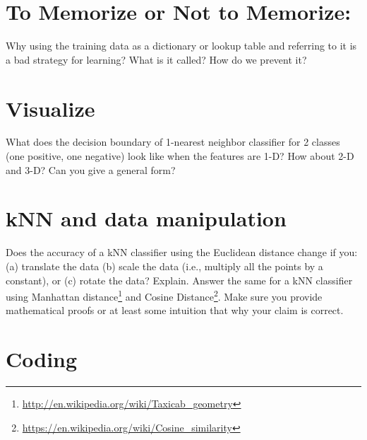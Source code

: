 \documentclass[fleqn]{article}
\begin{document}



\section{To Memorize or Not to Memorize:}
Why using the training data as a dictionary or lookup table and referring to it is a bad strategy for learning? What is it called? How do we prevent it?


\section{Visualize} What does the decision boundary of 1-nearest neighbor classifier for 2 classes (one positive, one negative) look like when the features are 1-D? How about 2-D and 3-D? Can you give a general form?

\section{kNN and data manipulation}

Does the accuracy of a kNN classifier using the Euclidean distance change if you:(a) translate the data (b) scale the data (i.e., multiply all the points by a constant), or (c) rotate the data? Explain. Answer the same for a kNN classifier using Manhattan distance\footnote{\url{http://en.wikipedia.org/wiki/Taxicab_geometry}} and Cosine Distance\footnote{\url{https://en.wikipedia.org/wiki/Cosine_similarity}}. Make sure you provide mathematical proofs or at least some intuition that why your claim is correct.

\section{Coding}
\end{document}

